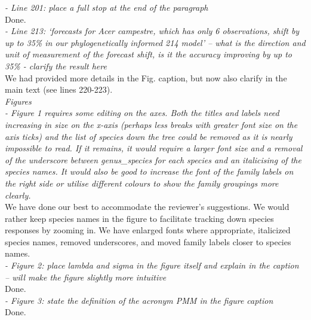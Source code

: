 \documentclass[11pt]{article}
\begin{document}

\emph{- Line 201: place a full stop at the end of the paragraph}\\
Done.\\

\emph{- Line 213: ‘forecasts for \emph{Acer campestre}, which has only 6 observations, shift by up to 35\% in our phylogenetically informed 214 model’ – what is the direction and unit of measurement of the forecast shift, is it the accuracy improving by up to 35\% - clarify the result here}\\
We had provided more details in the Fig. caption, but now also clarify in the main text (see lines 220-223).\\ %


\emph{Figures}\\
\emph{- Figure 1 requires some editing on the axes. Both the titles and labels need increasing in size on the x-axis (perhaps less breaks with greater font size on the axis ticks) and the list of species down the tree could be removed as it is nearly impossible to read. If it remains, it would require a larger font size and a removal of the underscore between genus\_species for each species and an italicising of the species names. It would also be good to increase the font of the family labels on the right side or utilise different colours to show the family groupings more clearly.}\\
We have done our best to accommodate the reviewer's suggestions. We would rather keep species names in the figure to facilitate tracking down species responses by zooming in. We have enlarged fonts where appropriate, italicized species names, removed underscores, and moved family labels closer to species names.\\

\emph{- Figure 2: place lambda and sigma in the figure itself and explain in the caption – will make the figure slightly more intuitive}\\
Done.\\

\emph{- Figure 3: state the definition of the acronym PMM in the figure caption}\\
Done.\\
\end{document}
